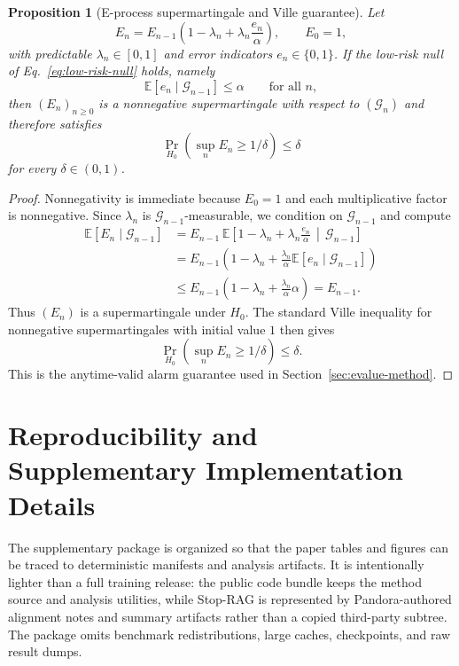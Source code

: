 \documentclass{article}
\newtheorem{proposition}{Proposition}[section]
\begin{document}
\begin{proposition}[E-process supermartingale and Ville guarantee]
\label{prop:eprocess-appendix}
Let
\[
  E_n=E_{n-1}\left(1-\lambda_n+\lambda_n\frac{e_n}{\alpha}\right),
  \qquad E_0=1,
\]
with predictable $\lambda_n\in[0,1]$ and error indicators $e_n\in\{0,1\}$. If the low-risk null of Eq.~\eqref{eq:low-risk-null} holds, namely
\[
  \mathbb{E}[e_n\mid\mathcal{G}_{n-1}]\le \alpha
  \qquad\text{for all }n,
\]
then $(E_n)_{n\ge 0}$ is a nonnegative supermartingale with respect to $(\mathcal{G}_n)$ and therefore satisfies
\[
  \Pr_{H_0}\!\left(\sup_n E_n\ge 1/\delta\right)\le \delta
\]
for every $\delta\in(0,1)$.
\end{proposition}

\begin{proof}
Nonnegativity is immediate because $E_0=1$ and each multiplicative factor is nonnegative. Since $\lambda_n$ is $\mathcal{G}_{n-1}$-measurable, we condition on $\mathcal{G}_{n-1}$ and compute
\begin{align*}
  \mathbb{E}[E_n\mid\mathcal{G}_{n-1}]
  &=
  E_{n-1}\,
  \mathbb{E}\left[1-\lambda_n+\lambda_n\frac{e_n}{\alpha}\,\middle|\,\mathcal{G}_{n-1}\right] \\
  &=
  E_{n-1}\left(
    1-\lambda_n+\frac{\lambda_n}{\alpha}\mathbb{E}[e_n\mid\mathcal{G}_{n-1}]
  \right) \\
  &\le
  E_{n-1}\left(1-\lambda_n+\frac{\lambda_n}{\alpha}\alpha\right)
  =
  E_{n-1}.
\end{align*}
Thus $(E_n)$ is a supermartingale under $H_0$. The standard Ville inequality for nonnegative supermartingales with initial value $1$ then gives
\[
  \Pr_{H_0}\!\left(\sup_n E_n\ge 1/\delta\right)\le \delta.
\]
This is the anytime-valid alarm guarantee used in Section~\ref{sec:evalue-method}.
\end{proof}

\section{Reproducibility and Supplementary Implementation Details}
\label{app:repro}

The supplementary package is organized so that the paper tables and figures can be traced to deterministic manifests and analysis artifacts. It is intentionally lighter than a full training release: the public code bundle keeps the method source and analysis utilities, while Stop-RAG is represented by Pandora-authored alignment notes and summary artifacts rather than a copied third-party subtree. The package omits benchmark redistributions, large caches, checkpoints, and raw result dumps.
\end{document}
